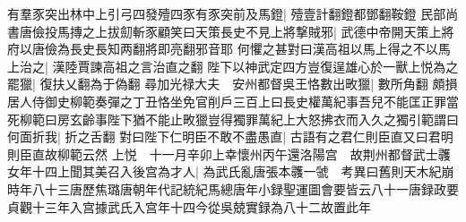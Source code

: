 有羣豕突出林中上引弓四發殪四豕有豕突前及馬鐙|{
	殪壹計翻鐙都鄧翻鞍鐙}
民部尚書唐儉投馬摶之上拔劎斬豕顧笑曰天策長史不見上將撃賊邪|{
	武德中帝開天策上將府以唐儉為長史長知两翻將即亮翻邪音耶}
何懼之甚對曰漢高祖以馬上得之不以馬上治之|{
	漢陸賈諫高祖之言治直之翻}
陛下以神武定四方豈復逞雄心於一獸上悦為之罷獵|{
	復扶乂翻為于偽翻}
尋加光禄大夫　安州都督吳王恪數出畋獵|{
	數所角翻}
頗損居人侍御史柳範奏彈之丁丑恪坐免官削戶三百上曰長史權萬紀事吾兒不能匡正罪當死柳範曰房玄齡事陛下猶不能止畋獵豈得獨罪萬紀上大怒拂衣而入久之獨引範謂曰何面折我|{
	折之舌翻}
對曰陛下仁明臣不敢不盡愚直|{
	古語有之君仁則臣直又曰君明則臣直故柳範云然}
上悦　十一月辛卯上幸懷州丙午還洛陽宫　故荆州都督武士彠女年十四上聞其美召入後宫為才人|{
	為武氏亂唐張本彠一虢　考異曰舊則天木紀崩時年八十三唐歷焦璐唐朝年代記統紀馬總唐年小録聖運圖會要皆云八十一唐録政要貞觀十三年入宫據武氏入宫年十四今從吳兢實録為八十二故置此年}


